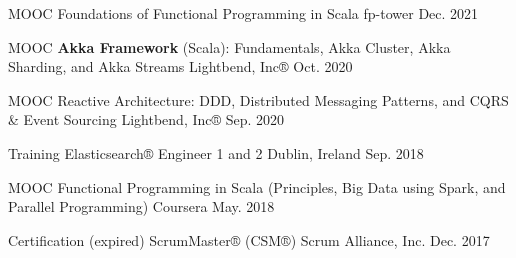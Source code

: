 
\begin{cvhonors}
  \vspace{-1.0mm}
  \cvhonor
    {MOOC}
    {Foundations of Functional Programming in Scala }
    {fp-tower}
    {Dec. 2021}

  \cvhonor
    {MOOC}
    {\textbf{Akka Framework} (Scala): Fundamentals, Akka Cluster, Akka Sharding, and Akka Streams}
    {Lightbend, Inc®}
    {Oct. 2020}

  \cvhonor
    {MOOC}
    {Reactive Architecture: DDD, Distributed Messaging Patterns, and CQRS \& Event Sourcing}
    {Lightbend, Inc®}
    {Sep. 2020}

  \cvhonor
    {Training}
    {Elasticsearch® Engineer 1 and 2}
    {Dublin, Ireland}
    {Sep. 2018}

  \cvhonor
    {MOOC}
    {Functional Programming in Scala (Principles, Big Data using Spark, and Parallel Programming)}
    {Coursera}
    {May. 2018}
  
  \cvhonor
    {Certification (expired)}
    {ScrumMaster® (CSM®)}
    {Scrum Alliance, Inc.}
    {Dec. 2017}

\end{cvhonors}